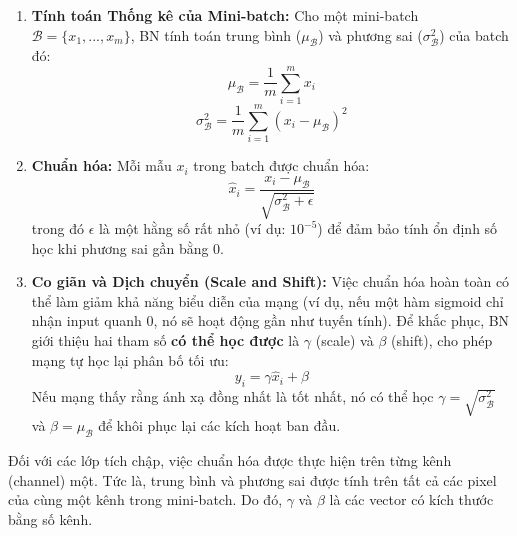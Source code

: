 \begin{enumerate}
	\item \textbf{Tính toán Thống kê của Mini-batch:} Cho một mini-batch $\mathcal{B} = \{x_1, ..., x_m\}$, BN tính toán trung bình ($\mu_{\mathcal{B}}$) và phương sai ($\sigma_{\mathcal{B}}^2$) của batch đó:
	\begin{equation}
		\mu_{\mathcal{B}} = \frac{1}{m} \sum_{i=1}^{m} x_i
	\end{equation}
	\begin{equation}
		\sigma_{\mathcal{B}}^2 = \frac{1}{m} \sum_{i=1}^{m} (x_i - \mu_{\mathcal{B}})^2
	\end{equation}
	
	\item \textbf{Chuẩn hóa:} Mỗi mẫu $x_i$ trong batch được chuẩn hóa:
	\begin{equation}
		\hat{x}_i = \frac{x_i - \mu_{\mathcal{B}}}{\sqrt{\sigma_{\mathcal{B}}^2 + \epsilon}}
	\end{equation}
	trong đó $\epsilon$ là một hằng số rất nhỏ (ví dụ: $10^{-5}$) để đảm bảo tính ổn định số học khi phương sai gần bằng 0.
	
	\item \textbf{Co giãn và Dịch chuyển (Scale and Shift):} Việc chuẩn hóa hoàn toàn có thể làm giảm khả năng biểu diễn của mạng (ví dụ, nếu một hàm sigmoid chỉ nhận input quanh 0, nó sẽ hoạt động gần như tuyến tính). Để khắc phục, BN giới thiệu hai tham số \textbf{có thể học được} là $\gamma$ (scale) và $\beta$ (shift), cho phép mạng tự học lại phân bố tối ưu:
	\begin{equation}
		y_i = \gamma \hat{x}_i + \beta
	\end{equation}
	Nếu mạng thấy rằng ánh xạ đồng nhất là tốt nhất, nó có thể học $\gamma = \sqrt{\sigma_{\mathcal{B}}^2}$ và $\beta = \mu_{\mathcal{B}}$ để khôi phục lại các kích hoạt ban đầu.
\end{enumerate}
Đối với các lớp tích chập, việc chuẩn hóa được thực hiện trên từng kênh (channel) một. Tức là, trung bình và phương sai được tính trên tất cả các pixel của cùng một kênh trong mini-batch. Do đó, $\gamma$ và $\beta$ là các vector có kích thước bằng số kênh.

